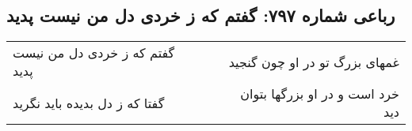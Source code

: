 \begin{center}
\section*{رباعی شماره ۷۹۷: گفتم که ز خردی دل من نیست پدید}
\label{sec:0797}
\begin{longtable}{l p{0.5cm} r}
گفتم که ز خردی دل من نیست پدید
&&
غمهای بزرگ تو در او چون گنجید
\\
گفتا که ز دل بدیده باید نگرید
&&
خرد است و در او بزرگها بتوان دید
\\
\end{longtable}
\end{center}
